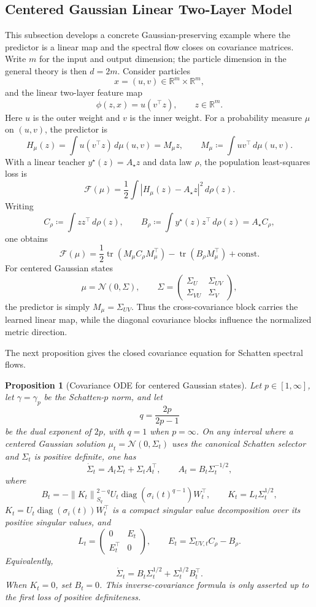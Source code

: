 \documentclass{article}
\newtheorem{proposition}[theorem]{Proposition}
\newcommand{\R}{\mathbb{R}}
\newcommand{\MF}{\mathcal{F}}
\newcommand{\tr}{\operatorname{tr}}
\newcommand{\diag}{\operatorname{diag}}
\newcommand{\norm}[1]{\left\lVert #1 \right\rVert}
\newcommand{\abs}[1]{\left\lvert #1 \right\rvert}
\begin{document}
\subsection{Centered Gaussian Linear Two-Layer Model}
This subsection develops a concrete Gaussian-preserving example where the
predictor is a linear map and the spectral flow closes on covariance
matrices. Write $m$ for the input and output dimension; the particle
dimension in the general theory is then $d=2m$.
Consider particles
$$
x=(u,v)\in\R^m\times\R^m,
$$
and the linear two-layer feature map
$$
\phi(z,x)=u(v^\top z),
\qquad z\in\R^m.
$$
Here $u$ is the outer weight and $v$ is the inner weight. For a probability
measure $\mu$ on $(u,v)$, the predictor is
$$
H_\mu(z)=\int u(v^\top z)\,d\mu(u,v)=M_\mu z,
\qquad
M_\mu\coloneqq \int uv^\top\,d\mu(u,v).
$$
With a linear teacher $y^\star(z)=A_\star z$ and data law $\rho$, the population least-squares loss is
$$
\MF(\mu)=\frac12\int \abs{H_\mu(z)-A_\star z}^2\,d\rho(z).
$$
Writing
$$
C_\rho\coloneqq \int zz^\top\,d\rho(z),
\qquad
B_\rho\coloneqq \int y^\star(z)z^\top\,d\rho(z)=A_\star C_\rho,
$$
one obtains
$$
\MF(\mu)=\frac12\tr(M_\mu C_\rho M_\mu^\top)-\tr(B_\rho M_\mu^\top)+\mathrm{const}.
$$
For centered Gaussian states
$$
\mu=\mathcal N(0,\Sigma),
\qquad
\Sigma=
\begin{pmatrix}
\Sigma_U & \Sigma_{UV}\\
\Sigma_{VU} & \Sigma_V
\end{pmatrix},
$$
the predictor is simply $M_\mu=\Sigma_{UV}$. Thus the cross-covariance block
carries the learned linear map, while the diagonal covariance blocks influence
the normalized metric direction.

The next proposition gives the closed covariance equation for Schatten spectral flows.
\begin{proposition}[Covariance ODE for centered Gaussian states]
\label{app-prop:gaussian-linear-covariance}
Let $p\in[1,\infty]$, let $\gamma=\gamma_p$ be the Schatten-$p$ norm, and let
$$
q=\frac{2p}{2p-1}
$$
be the dual exponent of $2p$, with $q=1$ when $p=\infty$.
On any interval where a centered Gaussian solution
$\mu_t=\mathcal N(0,\Sigma_t)$ uses the canonical Schatten selector and
$\Sigma_t$ is positive definite, one has
$$
\dot \Sigma_t=A_t\Sigma_t+\Sigma_tA_t^\top,
\qquad
A_t=B_t\Sigma_t^{-1/2},
$$
where
$$
B_t=-\norm{K_t}_{S_q}^{2-q}U_t\diag(\sigma_i(t)^{q-1})W_t^\top,
\qquad
K_t=L_t\Sigma_t^{1/2},
$$
$K_t=U_t\diag(\sigma_i(t))W_t^\top$ is a compact singular value decomposition
over its positive singular values, and
$$
L_t=
\begin{pmatrix}
0 & E_t\\
E_t^\top & 0
\end{pmatrix},
\qquad
E_t=\Sigma_{UV,t}C_\rho-B_\rho.
$$
Equivalently,
$$
\dot \Sigma_t=B_t\Sigma_t^{1/2}+\Sigma_t^{1/2}B_t^\top.
$$
When $K_t=0$, set $B_t=0$. This inverse-covariance formula is only asserted
up to the first loss of positive definiteness.
\end{proposition}
\end{document}

